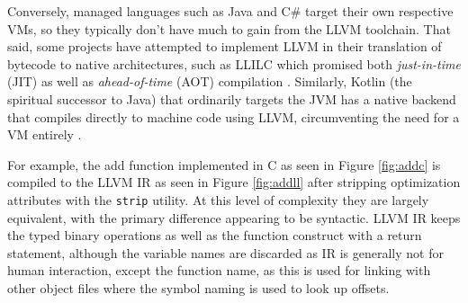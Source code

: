 \documentclass{article}
\begin{document}
Conversely, managed languages such as Java and C\# target their own respective VMs, so they typically don't have much to gain from the LLVM toolchain. That said, some projects have attempted to implement LLVM in their translation of bytecode to native architectures,  such as LLILC which promised both \textit{just-in-time} (JIT) as well as \textit{ahead-of-time} (AOT) compilation \cite{dotnet}. Similarly, Kotlin (the spiritual successor to Java) that ordinarily targets the JVM has a native backend that compiles directly to machine code using LLVM, circumventing the need for a VM entirely \cite{kotlin}.

For example, the add function implemented in C as seen in Figure \ref{fig:addc} is compiled to the LLVM IR as seen in Figure \ref{fig:addll} after stripping optimization attributes with the \texttt{strip} utility. At this level of complexity they are largely equivalent, with the primary difference appearing to be syntactic. LLVM IR keeps the typed binary operations as well as the function construct with a return statement, although the variable names are discarded as IR is generally not for human interaction, except the function name, as this is used for linking with other object files where the symbol naming is used to look up offsets.
\end{document}
